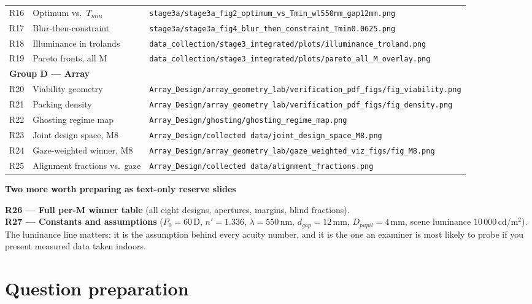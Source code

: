 \documentclass[11pt]{report}
\newenvironment{keybox}[1]%
{\par\vspace{6pt}\begin{lrbox}{\kbsave}\begin{minipage}{0.88\textwidth}%
{\bfseries\color{hbblue}#1}\par\vspace{4pt}\ignorespaces}%
{\end{minipage}\end{lrbox}%
\begin{center}\setlength{\fboxrule}{1.2pt}\setlength{\fboxsep}{7pt}%
\fcolorbox{hbblue}{boxgrey}{\usebox{\kbsave}}\end{center}\vspace{6pt}\par}
\begin{document}
\begin{longtable}{p{0.8cm}p{5.3cm}p{8.2cm}}
R16 & Optimum vs.\ $T_{min}$ & \texttt{stage3a/stage3a\_fig2\_optimum\_vs\_Tmin\_wl550nm\_gap12mm.png} \\
R17 & Blur-then-constraint & \texttt{stage3a/stage3a\_fig4\_blur\_then\_constraint\_Tmin0.0625.png} \\
R18 & Illuminance in trolands & \texttt{data\_collection/stage3\_integrated/plots/illuminance\_troland.png} \\
R19 & Pareto fronts, all M & \texttt{data\_collection/stage3\_integrated/plots/pareto\_all\_M\_overlay.png} \\
\midrule
\multicolumn{3}{l}{\textbf{Group D --- Array}}\\
R20 & Viability geometry & \texttt{Array\_Design/array\_geometry\_lab/verification\_pdf\_figs/fig\_viability.png} \\
R21 & Packing density & \texttt{Array\_Design/array\_geometry\_lab/verification\_pdf\_figs/fig\_density.png} \\
R22 & Ghosting regime map & \texttt{Array\_Design/ghosting/ghosting\_regime\_map.png} \\
R23 & Joint design space, M8 & \texttt{Array\_Design/collected data/joint\_design\_space\_M8.png} \\
R24 & Gaze-weighted winner, M8 & \texttt{Array\_Design/array\_geometry\_lab/gaze\_weighted\_viz\_figs/fig\_M8.png} \\
R25 & Alignment fractions vs.\ gaze & \texttt{Array\_Design/collected data/alignment\_fractions.png} \\
\bottomrule
\end{longtable}

\begin{keybox}{Two more worth preparing as text-only reserve slides}
\textbf{R26 --- Full per-M winner table} (all eight designs, apertures, margins, blind fractions).\\
\textbf{R27 --- Constants and assumptions} ($P_0=60$\,D, $n'=1.336$, $\lambda=550$\,nm,
$d_{gap}=12$\,mm, $D_{pupil}=4$\,mm, scene luminance 10\,000\,cd/m$^2$). The luminance line matters:
it is the assumption behind every acuity number, and it is the one an examiner is most likely to
probe if you present measured data taken indoors.
\end{keybox}

\chapter{Question preparation}
\end{document}
